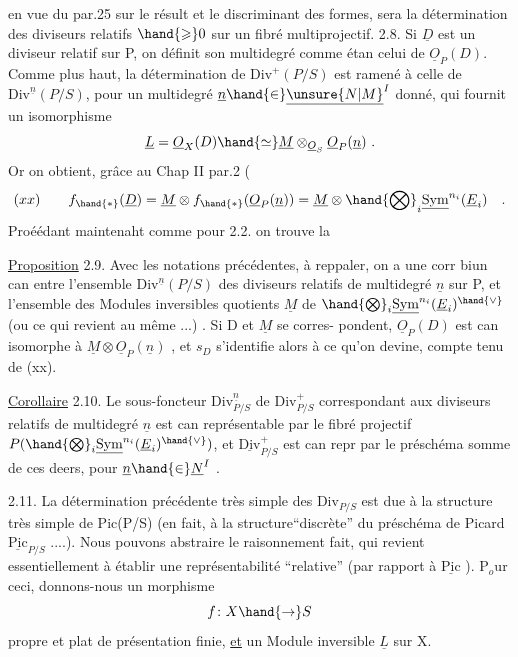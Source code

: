 
en vue du par.25 sur le résult  et le discriminant des formes, sera la
détermination des diviseurs relatifs $\hand{\geqslant} 0$ sur un fibré multiprojectif.
2.8.
Si $\underline{D}$ est un diviseur relatif sur P, on définit son multidegré comme étan
celui de $\underline{O}_P(D)$. Comme plus haut, la détermination de $\mathrm{Div}^{+}(P/S)$ est ramené
à celle de $\mathrm{Div}^{\underline{n}}(P/S)$, pour un multidegré $\underline{n}\hand{\in}\underline{\unsure{N|M}}^{I}$ donné, qui fournit un
isomorphisme
\[ \underline{L} =\underline{O}_X(D) \hand{\simeq} \underline{M} \otimes_{\underline{O}_S} \underline{O}_P(\underline{n}) \ . \]
Or on obtient, grâce au Chap II par.2 (
\[ (xx) \qquad f_{\hand{*}}(\underline{D}) = \underline{M} \otimes f_{\hand{*}}(\underline{O}_P(\underline{n})) = \underline{M} \otimes \hand{\bigotimes}_i \underline{\mathrm{Sym}}^{n_i}(\underline{E}_i) \quad . \]
Proéédant maintenaht comme pour 2.2. on trouve la

\uline{Proposition} 2.9. Avec les notations précédentes, à reppaler, on a une
corr biun can entre l'ensemble $\mathrm{Div}^{\underline{n}}(P/S)$ des diviseurs relatifs de
multidegré $\underline{n}$ sur P, et l'ensemble des Modules inversibles quotients $\underline{M}$
de $\hand{\bigotimes}_i \underline{\mathrm{Sym}}^{n_i}(\underline{E}_i)^{\hand{\vee}}$ (ou ce qui revient au même ...) . Si D et $\underline{M}$ se corres-%
pondent, $\underline{O}_P(D)$ est can isomorphe à $\underline{M}\otimes\underline{O}_P(\underline{n})$ , et $s_D$ s'identifie alors
à ce qu'on devine, compte tenu de (xx).

\uline{Corollaire} 2.10. Le sous-foncteur $\mathrm{Div}^{\underline{n}}_{P/S}$ de $\mathrm{Div}^{+}_{P/S}$ correspondant aux
diviseurs relatifs de multidegré $\underline{n}$ est can représentable par le fibré
projectif $P(\hand{\bigotimes}_i \underline{\mathrm{Sym}}^{n_i}(\underline{E}_i)^{\hand{\vee}})$, et $\underline{\mathrm{Div}}^{+}_{P/S}$ est can repr par le préschéma
somme de ces deers, pour $\underline{n}\hand{\in}\underline{N}^{I}$ .

2.11. La détermination précédente très simple des $\mathrm{Div}_{P/S}$ est due à la
structure très simple de Pic(P/S) (en fait, à la structure``discrète'' du
préschéma de Picard $\underline{\mathrm{Pic}}_{P/S}$ ....). Nous pouvons abstraire le raisonnement
fait, qui revient essentiellement à établir une représentabilité ``relative''
(par rapport à $\underline{\mathrm{Pic}}$ ). P$_o$ur ceci, donnons-nous un morphisme
\[ f\colon X \hand{\to} S \]
propre et plat de présentation finie, \uline{et} un Module inversible $\underline{L}$ sur X.

